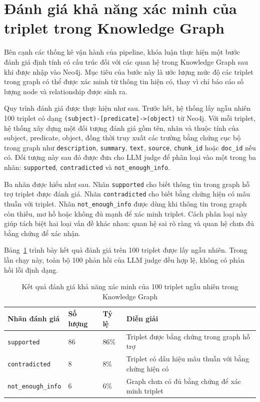 \section{Đánh giá khả năng xác minh của triplet trong Knowledge Graph}

Bên cạnh các thống kê vận hành của pipeline, khóa luận thực hiện một bước đánh giá định tính có cấu trúc đối với các quan hệ trong Knowledge Graph sau khi được nhập vào Neo4j. Mục tiêu của bước này là ước lượng mức độ các triplet trong graph có thể được xác minh từ thông tin hiện có, thay vì chỉ báo cáo số lượng node và relationship được sinh ra.

Quy trình đánh giá được thực hiện như sau. Trước hết, hệ thống lấy ngẫu nhiên 100 triplet có dạng \texttt{(subject)-[predicate]->(object)} từ Neo4j. Với mỗi triplet, hệ thống xây dựng một đối tượng đánh giá gồm tên, nhãn và thuộc tính của subject, predicate, object, đồng thời truy xuất các trường bằng chứng cục bộ trong graph như \texttt{description}, \texttt{summary}, \texttt{text}, \texttt{source}, \texttt{chunk\_id} hoặc \texttt{doc\_id} nếu có. Đối tượng này sau đó được đưa cho LLM judge để phân loại vào một trong ba nhãn: \texttt{supported}, \texttt{contradicted} và \texttt{not\_enough\_info}.

Ba nhãn được hiểu như sau. Nhãn \texttt{supported} cho biết thông tin trong graph hỗ trợ triplet được đánh giá. Nhãn \texttt{contradicted} cho biết bằng chứng hiện có mâu thuẫn với triplet. Nhãn \texttt{not\_enough\_info} được dùng khi thông tin trong graph còn thiếu, mơ hồ hoặc không đủ mạnh để xác minh triplet. Cách phân loại này giúp tách biệt hai loại vấn đề khác nhau: quan hệ sai rõ ràng và quan hệ chưa đủ bằng chứng để xác nhận.

Bảng~\ref{tab:triplet_verifiability_results} trình bày kết quả đánh giá trên 100 triplet được lấy ngẫu nhiên. Trong lần chạy này, toàn bộ 100 phản hồi của LLM judge đều hợp lệ, không có phản hồi lỗi định dạng.

\begin{table}[H]
\centering
\caption{Kết quả đánh giá khả năng xác minh của 100 triplet ngẫu nhiên trong Knowledge Graph}
\label{tab:triplet_verifiability_results}
\begin{tabularx}{\textwidth}{|p{}|p{}|p{}|X|}
\hline
\textbf{Nhãn đánh giá} & \textbf{Số lượng} & \textbf{Tỷ lệ} & \textbf{Diễn giải} \\
\hline
\texttt{supported} & 86 & 86\% & Triplet được bằng chứng trong graph hỗ trợ \\
\hline
\texttt{contradicted} & 8 & 8\% & Triplet có dấu hiệu mâu thuẫn với bằng chứng hiện có \\
\hline
\texttt{not\_enough\_info} & 6 & 6\% & Graph chưa có đủ bằng chứng để xác minh triplet \\
\hline
\end{tabularx}
\end{table}

